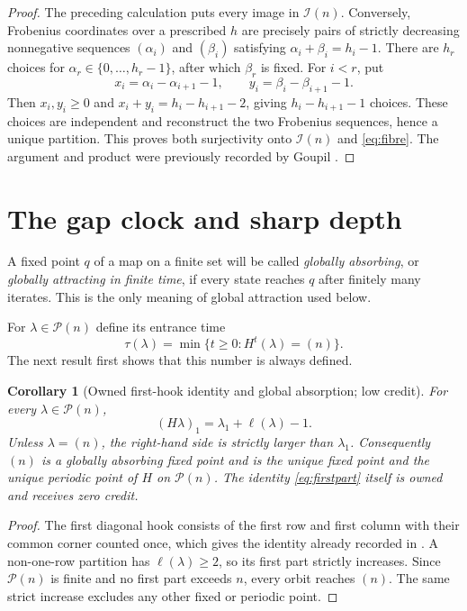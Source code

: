 \documentclass[10pt]{amsart}
\newtheorem{corollary}[theorem]{Corollary}
\theoremstyle{definition}
\newcommand{\Par}{\mathcal P}
\newcommand{\Img}{\mathcal I}
\newcommand{\ellp}{\ell}
\begin{document}
\begin{proof}
The preceding calculation puts every image in $\Img(n)$.  Conversely,
Frobenius coordinates over a prescribed $h$ are precisely pairs of strictly
decreasing nonnegative sequences $(\alpha_i)$ and $(\beta_i)$ satisfying
$\alpha_i+\beta_i=h_i-1$.  There are $h_r$ choices for
$\alpha_r\in\{0,\ldots,h_r-1\}$, after which $\beta_r$ is fixed.  For
$i<r$, put
\[
 x_i=\alpha_i-\alpha_{i+1}-1,
 \qquad
 y_i=\beta_i-\beta_{i+1}-1.
\]
Then $x_i,y_i\geq0$ and
$x_i+y_i=h_i-h_{i+1}-2$, giving
$h_i-h_{i+1}-1$ choices.  These choices are independent and reconstruct the
two Frobenius sequences, hence a unique partition.  This proves both
surjectivity onto $\Img(n)$ and \eqref{eq:fibre}.  The argument and product
were previously recorded by Goupil \cite{Goupil2009}.
\end{proof}

\section{The gap clock and sharp depth}

A fixed point $q$ of a map on a finite set will be called
\emph{globally absorbing}, or \emph{globally attracting in finite time}, if
every state reaches $q$ after finitely many iterates.  This is the only
meaning of global attraction used below.

For $\lambda\in\Par(n)$ define its entrance time
\[
 \tau(\lambda)=\min\{t\geq0:H^t(\lambda)=(n)\}.
\]
The next result first shows that this number is always defined.

\begin{corollary}[Owned first-hook identity and global absorption; low credit]
\label{cor:absorption}
For every $\lambda\in\Par(n)$,
\begin{equation}
 \label{eq:firstpart}
 (H\lambda)_1=\lambda_1+\ellp(\lambda)-1.
\end{equation}
Unless $\lambda=(n)$, the right-hand side is strictly larger than
$\lambda_1$.  Consequently $(n)$ is a globally absorbing fixed point and is
the unique fixed point and the unique periodic point of $H$ on $\Par(n)$.
The identity \eqref{eq:firstpart} itself is owned and receives zero credit.
\end{corollary}

\begin{proof}
The first diagonal hook consists of the first row and first column with their
common corner counted once, which gives the identity already recorded in
\cite{Gutschwager2011}.  A non-one-row partition has
$\ellp(\lambda)\geq2$, so its first part strictly increases.  Since
$\Par(n)$ is finite and no first part exceeds $n$, every orbit reaches
$(n)$.  The same strict increase excludes any other fixed or periodic point.
\end{proof}
\end{document}
